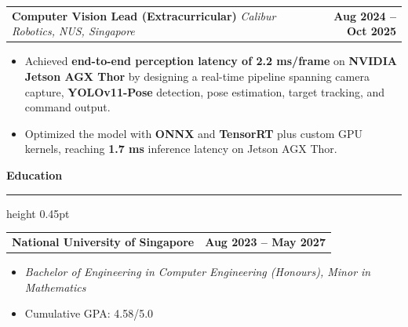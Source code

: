 \documentclass[10pt,letterpaper]{article}
\makeatletter
\newcommand{\cvsection}[1]{%
  \vspace{8pt}%
  {\fontsize{13.5pt}{15pt}\selectfont\bfseries #1}\par
  \vspace{1.5pt}\hrule height 0.45pt\vspace{3pt}%
}
\newcommand{\role}[3]{%
  {\fontsize{10pt}{11pt}\selectfont
  \begin{tabularx}{\textwidth}{@{}>{\raggedright\arraybackslash}Xr@{}}
    \textbf{#1} \textit{#2} & \textbf{#3}
  \end{tabularx}}\vspace{-1pt}%
}
\newenvironment{cvitems}{%
  \begin{itemize}[
    leftmargin=0.285in,
    labelsep=0.075in,
    itemsep=1.2pt,
    topsep=1.5pt,
    parsep=0pt,
    partopsep=0pt
  ]\raggedright
}{\end{itemize}}
\makeatother
\begin{document}
\role{Computer Vision Lead (Extracurricular)}{Calibur Robotics, NUS, Singapore}{Aug 2024 -- Oct 2025}
\begin{cvitems}
  \item Achieved \textbf{end-to-end perception latency of 2.2 ms/frame} on \textbf{NVIDIA Jetson AGX Thor} by designing a real-time pipeline spanning camera capture, \textbf{YOLOv11-Pose} detection, pose estimation, target tracking, and command output.
  \item Optimized the model with \textbf{ONNX} and \textbf{TensorRT} plus custom GPU kernels, reaching \textbf{1.7 ms} inference latency on Jetson AGX Thor.
\end{cvitems}

\cvsection{Education}
\role{National University of Singapore}{}{Aug 2023 -- May 2027}
\begin{cvitems}
  \item \textit{Bachelor of Engineering in Computer Engineering (Honours), Minor in Mathematics}
  \item Cumulative GPA: 4.58/5.0
\end{cvitems}
\end{document}
